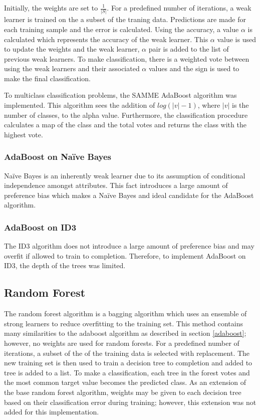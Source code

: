 \documentclass[11pt]{article}
\begin{document}
Initially, the weights are set to $\frac{1}{|S|}$. For a predefined number of iterations, a weak learner is trained on the a subset of the traning data. Predictions are made for each training sample and the error is calculated. Using the accuracy, a value $\alpha$ is calculated which represents the accuracy of the weak learner. This $\alpha$ value is used to update the weights and the weak learner, $\alpha$ pair is added to the list of previous weak learners. To make classification, there is a weighted vote between using the weak learners and their associated $\alpha$ values and the sign is used to make the final classification.

To multiclass classification problems, the SAMME AdaBoost algorithm \cite{samme} was implemented. This algorithm sees the addition of $log(|v|-1)$, where $|v|$ is the number of classes, to the alpha value. Furthermore, the classification procedure calculates a map of the class and the total votes and returns the class with the highest vote.

\subsubsection{AdaBoost on Naïve Bayes}
Naïve Bayes is an inherently weak learner due to its assumption of conditional independence amongst attributes. This fact introduces a large amount of preference bias which makes a Naïve Bayes and ideal candidate for the AdaBoost algorithm.

\subsubsection{AdaBoost on ID3}
The ID3 algorithm does not introduce a large amount of preference bias and may overfit if allowed to train to completion. Therefore, to implement AdaBoost on ID3, the depth of the trees was limited.

\subsection{Random Forest}
The random forest algorithm is a bagging algorithm which uses an ensemble of strong learners to reduce overfitting to the training set. This method contains many similarities to the adaboost algorithm as described in section \ref{adaboost}; however, no weights are used for random forests. For a predefined number of iterations, a subset of the of the training data is selected with replacement. The new training set is then used to train a decision tree to completion and added to tree is added to a list. To make a classification, each tree in the forest votes and the most common target value becomes the predicted class. As an extension of the base random forest algorithm, weights may be given to each decision tree based on their classification error during training; however, this extension was not added for this implementation.
\end{document}
